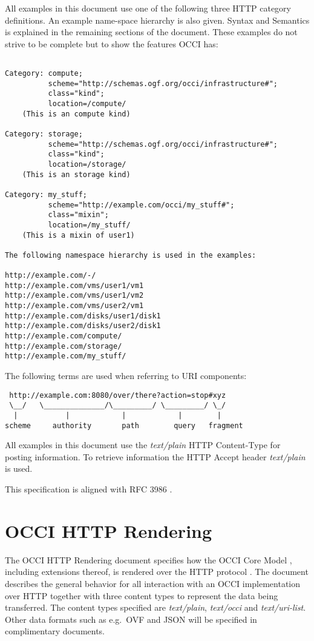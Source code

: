 \documentclass[10pt,a4paper]{article}
\begin{document}
All examples in this document use one of the following three HTTP
category definitions. An example name-space hierarchy is also
given. Syntax and Semantics is explained in the remaining sections of
the document. These examples do not strive to be complete but to show
the features OCCI has:

\begin{verbatim}

Category: compute;
          scheme="http://schemas.ogf.org/occi/infrastructure#";
          class="kind";
          location=/compute/
    (This is an compute kind)

Category: storage;
          scheme="http://schemas.ogf.org/occi/infrastructure#";
          class="kind";
          location=/storage/
    (This is an storage kind)

Category: my_stuff;
          scheme="http://example.com/occi/my_stuff#";
          class="mixin";
          location=/my_stuff/ 
    (This is a mixin of user1)

The following namespace hierarchy is used in the examples:

http://example.com/-/
http://example.com/vms/user1/vm1
http://example.com/vms/user1/vm2
http://example.com/vms/user2/vm1
http://example.com/disks/user1/disk1
http://example.com/disks/user2/disk1
http://example.com/compute/
http://example.com/storage/
http://example.com/my_stuff/
\end{verbatim}

The following terms \cite{rfc3986} are used when referring to URI
components:

\begin{verbatim}
 http://example.com:8080/over/there?action=stop#xyz
 \__/   \______________/\_________/ \_________/ \_/
  |           |            |            |        |
scheme     authority       path        query   fragment
\end{verbatim}

All examples in this document use the \emph{text/plain} HTTP
Content-Type for posting information. To retrieve information the HTTP
Accept header \emph{text/plain} is used.

This specification is aligned with RFC 3986 \cite{rfc3986}.

\section{OCCI HTTP Rendering}
The OCCI HTTP Rendering document specifies how the OCCI Core Model
\cite{occi:core}, including extensions thereof, is rendered over the
HTTP protocol \cite{rfc2616}. The document describes the general
behavior for all interaction with an OCCI implementation over HTTP
together with three content types to represent the data being
transferred. The content types specified are \textit{text/plain},
\textit{text/occi} and \textit{text/uri-list}. Other data formats such
as e.g.~OVF and JSON will be specified in complimentary documents.
\end{document}
